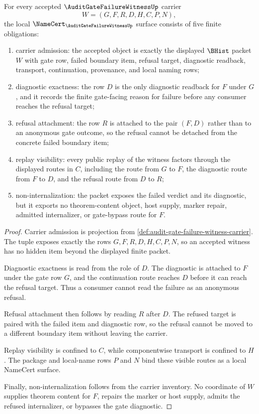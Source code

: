 \begin{theorem}
\label{thm:audit-gate-failure-witness-namecert-obligations}
For every accepted $\AuditGateFailureWitnessUp$ carrier
$$
W=(G,F,R,D,H,C,P,N),
$$
the local $\NameCert_{\AuditGateFailureWitnessUp}$ surface consists of five finite obligations:
\begin{enumerate}
\item carrier admission: the accepted object is exactly the displayed $\BHist$ packet $W$ with gate row, failed boundary item, refusal target, diagnostic readback, transport, continuation, provenance, and local naming rows;
\item diagnostic exactness: the row $D$ is the only diagnostic readback for $F$ under $G$, and it records the finite gate-facing reason for failure before any consumer reaches the refusal target;
\item refusal attachment: the row $R$ is attached to the pair $(F,D)$ rather than to an anonymous gate outcome, so the refusal cannot be detached from the concrete failed boundary item;
\item replay visibility: every public replay of the witness factors through the displayed routes in $C$, including the route from $G$ to $F$, the diagnostic route from $F$ to $D$, and the refusal route from $D$ to $R$;
\item non-internalization: the packet exposes the failed verdict and its diagnostic, but it exports no theorem-content object, host supply, marker repair, admitted internalizer, or gate-bypass route for $F$.
\end{enumerate}
\end{theorem}
\begin{proof}
Carrier admission is projection from \autoref{def:audit-gate-failure-witness-carrier}. The tuple exposes exactly the rows $G,F,R,D,H,C,P,N$, so an accepted witness has no hidden item beyond the displayed finite packet.

Diagnostic exactness is read from the role of $D$. The diagnostic is attached to $F$ under the gate row $G$, and the continuation route reaches $D$ before it can reach the refusal target. Thus a consumer cannot read the failure as an anonymous refusal.

Refusal attachment then follows by reading $R$ after $D$. The refused target is paired with the failed item and diagnostic row, so the refusal cannot be moved to a different boundary item without leaving the carrier.

Replay visibility is confined to $C$, while componentwise transport is confined to $H$. The package and local-name rows $P$ and $N$ bind these visible routes as a local NameCert surface.

Finally, non-internalization follows from the carrier inventory. No coordinate of $W$ supplies theorem content for $F$, repairs the marker or host supply, admits the refused internalizer, or bypasses the gate diagnostic.
\end{proof}


